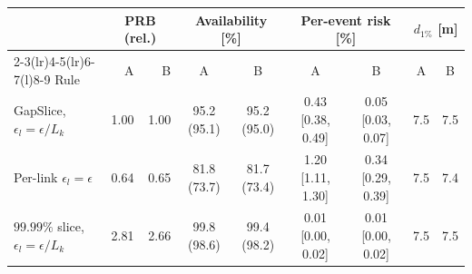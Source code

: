 \begin{tabular}{@{}l r r c c c c c c@{}}
\toprule
 & \multicolumn{2}{c}{PRB (rel.)} & \multicolumn{2}{c}{Availability [\%]} & \multicolumn{2}{c}{Per-event risk [\%]} & \multicolumn{2}{c}{$d_{1\%}$ [m]}\\
\cmidrule(lr){2-3}\cmidrule(lr){4-5}\cmidrule(lr){6-7}\cmidrule(l){8-9}
Rule & A & B & A & B & A & B & A & B\\
\midrule
GapSlice, $\epsilon_l=\epsilon/L_k$ & 1.00 & 1.00 & 95.2 {\scriptsize(95.1)} & 95.2 {\scriptsize(95.0)} & 0.43 {\scriptsize[0.38, 0.49]} & 0.05 {\scriptsize[0.03, 0.07]} & 7.5 & 7.5\\
Per-link $\epsilon_l=\epsilon$ & 0.64 & 0.65 & 81.8 {\scriptsize(73.7)} & 81.7 {\scriptsize(73.4)} & 1.20 {\scriptsize[1.11, 1.30]} & 0.34 {\scriptsize[0.29, 0.39]} & 7.5 & 7.4\\
$99.99\%$ slice, $\epsilon_l=\epsilon/L_k$ & 2.81 & 2.66 & 99.8 {\scriptsize(98.6)} & 99.4 {\scriptsize(98.2)} & 0.01 {\scriptsize[0.00, 0.02]} & 0.01 {\scriptsize[0.00, 0.02]} & 7.5 & 7.5\\
\bottomrule
\end{tabular}
